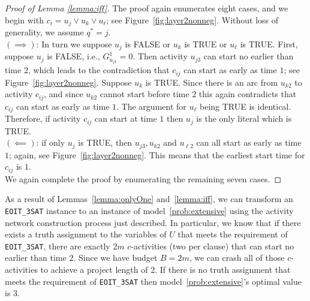 \documentclass[11pt]{article}
\newcommand{\noi}{\noindent}
\newcommand{\tcr}{\textcolor{red}}
\newcommand{\tcb}{\textcolor{blue}}
\begin{document}
	\begin{proof}[Proof of Lemma \ref{lemma:iff}]
    	The proof again enumerates eight cases, and we begin with $c_i=u_j \vee u_k \vee u_\ell$; see Figure~\ref{fig:layer2nonneg}. Without loss of generality, we assume \(q^* = j\).\\
		\((\implies)\): In turn we suppose $u_j$ is FALSE or $u_k$ is TRUE or $u_\ell$ is TRUE. 
		First, suppose \(u_j\) is FALSE, i.e., $G_{u_{j1}}^1=0$. Then activity \(u_{j3}\) can start no earlier than time \(2\), which leads to the contradiction that \(c_{ij}\) can start as early as time \(1\); see Figure~\ref{fig:layer2nonneg}. Suppose \(u_k\) is TRUE. 
		Since there is an arc from \(u_{k2}\) to activity \(c_{ij}\), and since \(u_{k2}\) cannot start before time \(2\) this again contradicts that \(c_{ij}\) can start as early as time \(1\). The argument for $u_\ell$ being TRUE is identical. Therefore, if activity \(c_{ij}\) can start at time \(1\) then \(u_j\) is the only literal which is TRUE.\\
		\((\impliedby)\): if only \(u_j\) is TRUE, then \(u_{j3}, u_{k2}\) and \(u_{\ell 2}\) can all start as early as time \(1\); again, see Figure~\ref{fig:layer2nonneg}. This means that the earliest start time for \(c_{ij}\) is \(1\). \\
		We again complete the proof by enumerating the remaining seven cases. 
	\end{proof}
	\noi As a result of Lemmas~\ref{lemma:onlyOne} and~\ref{lemma:iff},  we can transform an \verb|EOIT_3SAT| instance to an instance of model~\eqref{prob:extensive} using the activity network construction process just described. In particular, we know that if there exists a truth assignment to the variables of $U$ that meets the requirement of \verb|EOIT_3SAT|, there are exactly $2m$  \(c\)-activities (two per clause) that can start no earlier than time \(2\). Since we have budget \(B = 2m\), we can crash all of those \(c\)-activities to achieve a project length of \(2\). If there is no truth assignment that meets the requirement of \verb|EOIT_3SAT| then model~\eqref{prob:extensive}'s optimal value is $3$. 
\end{document}
